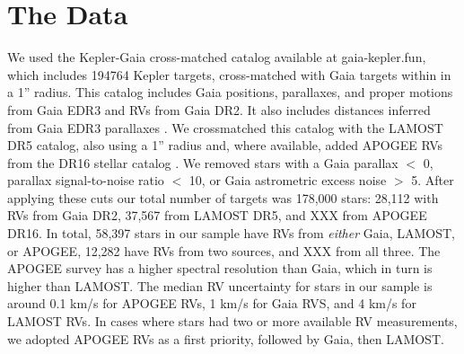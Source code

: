 \section{The Data}
\label{sec:data}

We used the Kepler-Gaia cross-matched catalog available at gaia-kepler.fun,
which includes 194764 Kepler targets, cross-matched with Gaia targets within
in a 1'' radius.
This catalog includes Gaia positions, parallaxes, and proper motions from
Gaia EDR3 and RVs from Gaia DR2.
It also includes distances inferred from Gaia EDR3 parallaxes
\citep{bailer-jones2020}.
We crossmatched this catalog with the LAMOST DR5 catalog, also using a 1''
radius and, where available, added APOGEE RVs from the DR16 stellar catalog
\citep{citations}.
We removed stars with a Gaia parallax $<$ 0, parallax signal-to-noise ratio
$<$ 10, or Gaia astrometric excess noise $>$ 5.
After applying these cuts our total number of targets was 178,000 stars:
28,112 with RVs from Gaia DR2, 37,567 from LAMOST DR5, and XXX from APOGEE
DR16.
In total, 58,397 stars in our sample have RVs from {\it either} Gaia,
LAMOST, or APOGEE, 12,282 have RVs from two sources, and XXX from all three.
The APOGEE survey has a higher spectral resolution than Gaia, which in turn is
higher than LAMOST.
The median RV uncertainty for stars in our sample is around 0.1 km/s for
APOGEE RVs, 1 km/s for Gaia RVS, and 4 km/s for LAMOST RVs.
In cases where stars had two or more available RV measurements, we adopted
APOGEE RVs as a first priority, followed by Gaia, then LAMOST.

